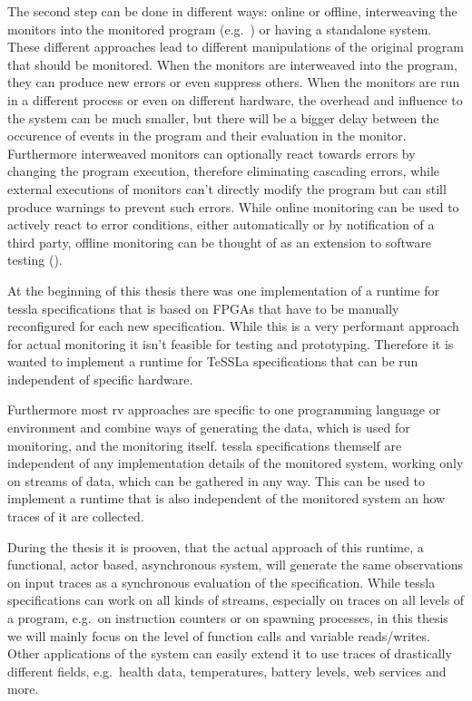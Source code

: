 The second step can be done in different ways: online or offline, interweaving the monitors into the monitored program (e.g.~\cite{Havelund2008}) or having a standalone system.
These different approaches lead to different manipulations of the original program that should be monitored.
When the monitors are interweaved into the program, they can produce new errors or even suppress others.
When the monitors are run in a different process or even on different hardware, the overhead and influence to the system can be much smaller,
but there will be a bigger delay between the occurence of events in the program and their evaluation in the monitor.
Furthermore interweaved monitors can optionally react towards errors by changing the program execution, therefore eliminating cascading errors,
while external executions of monitors can't directly modify the program but can still produce warnings to prevent such errors.
While online monitoring can be used to actively react to error conditions, either automatically or by notification of a third party,
offline monitoring can be thought of as an extension to software testing (\cite{DAngelo2005}).

At the beginning of this thesis there was one implementation of a runtime for \gls{tessla} specifications that is based on FPGAs that have to be manually reconfigured for each new specification.
While this is a very performant approach for actual monitoring it isn't feasible for testing and prototyping.
Therefore it is wanted to implement a runtime for TeSSLa specifications that can be run independent of specific hardware.

Furthermore most \gls{rv} approaches are specific to one programming language or environment and combine ways of generating the data, which is used for monitoring, and the monitoring itself.
\gls{tessla} specifications themself are independent of any implementation details of the monitored system, working only on streams of data, which can be gathered in any way.
This can be used to implement a runtime that is also independent of the monitored system an how traces of it are collected.

During the thesis it is prooven, that the actual approach of this runtime, a functional, actor based, asynchronous system,
will generate the same observations on input traces as a synchronous evaluation of the specification.
While \gls{tessla} specifications can work on all kinds of streams, especially on traces on all levels of a program, e.g.\
on instruction counters or on spawning processes, in this thesis we will mainly focus on the level of function calls and variable reads/writes.
Other applications of the system can easily extend it to use traces of drastically different fields, e.g.\ health data, temperatures, battery levels, web services and more.

